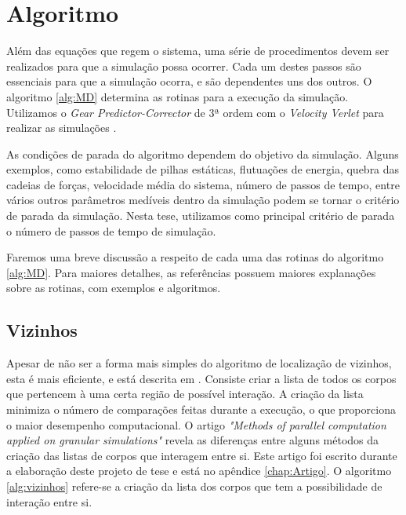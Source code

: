 \section{Algoritmo}
    Além das equações que regem o sistema, uma série de procedimentos devem ser realizados para que a simulação possa ocorrer. Cada um destes passos são essenciais para que a simulação ocorra, e são dependentes uns dos outros. O algoritmo \ref{alg:MD} determina as rotinas para a execução da simulação. Utilizamos o \textit{Gear Predictor-Corrector} de 3ª ordem com o \textit{Velocity Verlet} para realizar as simulações \cite{Computer_Simulation_of_Liquids}.



    As condições de parada do algoritmo dependem do objetivo da simulação. Alguns exemplos, como estabilidade de pilhas estáticas, flutuações de energia, quebra das cadeias de forças, velocidade média do sistema, número de passos de tempo, entre vários outros parâmetros medíveis dentro da simulação podem se tornar o critério de parada da simulação. Nesta tese, utilizamos como principal critério de parada o número de passos de tempo de simulação.

    Faremos uma breve discussão a respeito de cada uma das rotinas do algoritmo \ref{alg:MD}. Para maiores detalhes, as referências \cite{Dissertacao, Computer_Simulation_of_Liquids, Computational_Granular_Dynamics} possuem maiores explanações sobre as rotinas, com exemplos e algoritmos.

\subsection{Vizinhos}
    Apesar de não ser a forma mais simples do algoritmo de localização de vizinhos, esta é mais eficiente, e está descrita em \cite{Dissertacao}. Consiste criar a lista de todos os corpos que pertencem à uma certa região de possível interação. A criação da lista minimiza o número de comparações feitas durante a execução, o que proporciona o maior desempenho computacional. O artigo \textit{"Methods of parallel computation applied on granular simulations"}\cite{Methods_of_Parallel_Computation_Applied_on_Granular_Simulations} revela as diferenças entre alguns métodos da criação das listas de corpos que interagem entre si. Este artigo foi escrito durante a elaboração deste projeto de tese e está no apêndice \ref{chap:Artigo}. O algoritmo \ref{alg:vizinhos} refere-se a criação da lista dos corpos que tem a possibilidade de interação entre si.

